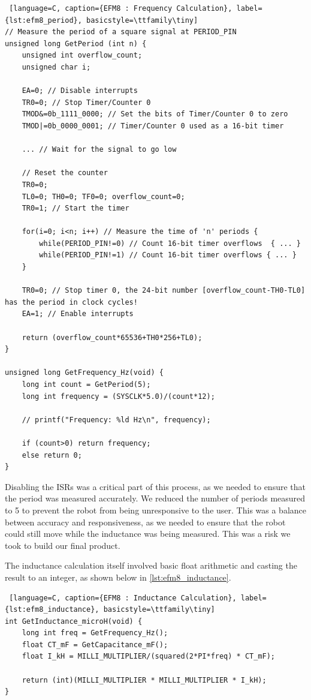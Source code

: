 \documentclass{article}
\begin{document}
\begin{lstlisting} [language=C, caption={EFM8 : Frequency Calculation}, label={lst:efm8_period}, basicstyle=\ttfamily\tiny]
// Measure the period of a square signal at PERIOD_PIN
unsigned long GetPeriod (int n) {
    unsigned int overflow_count;
    unsigned char i;

    EA=0; // Disable interrupts
    TR0=0; // Stop Timer/Counter 0
    TMOD&=0b_1111_0000; // Set the bits of Timer/Counter 0 to zero
    TMOD|=0b_0000_0001; // Timer/Counter 0 used as a 16-bit timer

    ... // Wait for the signal to go low

    // Reset the counter
    TR0=0;
    TL0=0; TH0=0; TF0=0; overflow_count=0;
    TR0=1; // Start the timer

    for(i=0; i<n; i++) // Measure the time of 'n' periods {
        while(PERIOD_PIN!=0) // Count 16-bit timer overflows  { ... }
        while(PERIOD_PIN!=1) // Count 16-bit timer overflows { ... }
    }

    TR0=0; // Stop timer 0, the 24-bit number [overflow_count-TH0-TL0] has the period in clock cycles!
    EA=1; // Enable interrupts

    return (overflow_count*65536+TH0*256+TL0);
}

unsigned long GetFrequency_Hz(void) {
    long int count = GetPeriod(5);
    long int frequency = (SYSCLK*5.0)/(count*12);

    // printf("Frequency: %ld Hz\n", frequency);

    if (count>0) return frequency;
    else return 0;
}
\end{lstlisting}

Disabling the ISRs was a critical part of this process, as we needed to ensure that the period was measured accurately.
We reduced the number of periods measured to 5 to prevent the robot from being unresponsive to the user. This was a balance between
accuracy and responsiveness, as we needed to ensure that the robot could still move while the inductance was being measured. This was a risk we took
to build our final product.

The inductance calculation itself involved basic float arithmetic and casting the result to an integer, as shown below in \ref{lst:efm8_inductance}.

\begin{lstlisting} [language=C, caption={EFM8 : Inductance Calculation}, label={lst:efm8_inductance}, basicstyle=\ttfamily\tiny]
int GetInductance_microH(void) {
    long int freq = GetFrequency_Hz();
    float CT_mF = GetCapacitance_mF();
	float I_kH = MILLI_MULTIPLIER/(squared(2*PI*freq) * CT_mF);

    return (int)(MILLI_MULTIPLIER * MILLI_MULTIPLIER * I_kH);
}
\end{lstlisting}
\end{document}
